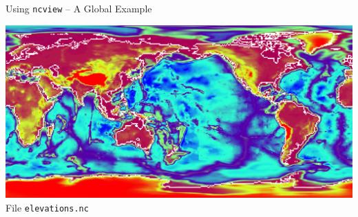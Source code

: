 \documentclass[compress,11pt,xcolor=svgnames,aspectratio=169]{beamer}
\begin{document}
\begin{frame}[fragile]{Using \texttt{ncview} -- A Global Example}

\begin{center}
\includegraphics[scale=0.4]{fig/elevations} \\
File \verb|elevations.nc|\\[0.3cm]
\end{center}

\end{frame}
\end{document}
